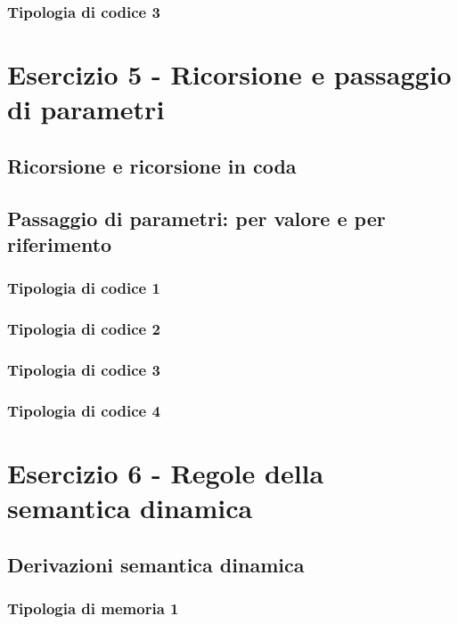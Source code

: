 \documentclass[a4paper]{article}
\begin{document}
	\subsubsection{Tipologia di codice 3}
	
	\section{Esercizio 5 - Ricorsione e passaggio di parametri}
	
	\subsection{Ricorsione e ricorsione in coda}
	
	\subsection{Passaggio di parametri: per valore e per riferimento}
	
	\subsubsection{Tipologia di codice 1}
	
	\subsubsection{Tipologia di codice 2}
	
	\subsubsection{Tipologia di codice 3}
	
	\subsubsection{Tipologia di codice 4}
	
	\section{Esercizio 6 - Regole della semantica dinamica}
	
	\subsection{Derivazioni semantica dinamica}
	
	\subsubsection{Tipologia di memoria 1}
	
\end{document}
